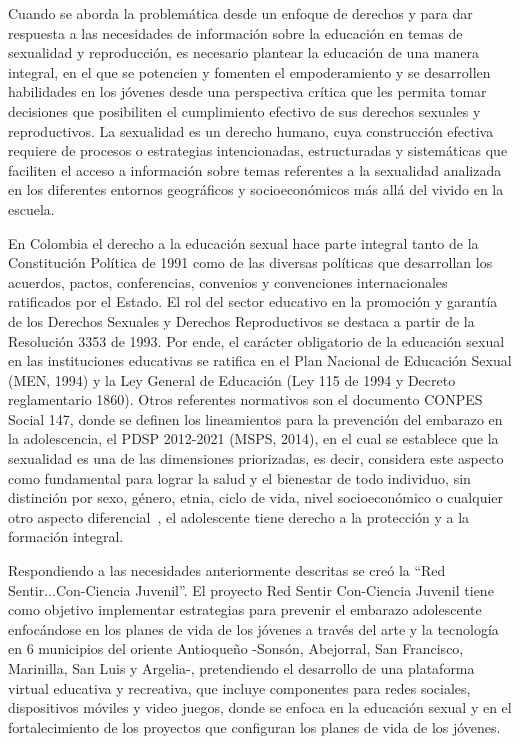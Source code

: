 \documentclass[journal,transmag]{IEEEtran}
\begin{document}
Cuando se aborda la problemática desde un enfoque de derechos y para dar respuesta a las necesidades de información sobre la educación en temas de sexualidad y reproducción, es necesario plantear la educación de una manera integral, en el que se potencien y fomenten el empoderamiento y se desarrollen habilidades en los jóvenes desde una perspectiva crítica que les permita tomar decisiones que posibiliten el cumplimiento efectivo de sus derechos sexuales y reproductivos. La sexualidad es un derecho humano, cuya construcción efectiva requiere de procesos o estrategias intencionadas, estructuradas y sistemáticas que faciliten el acceso a información sobre temas referentes a la sexualidad analizada en los diferentes entornos geográficos y socioeconómicos más allá del vivido en la escuela.

En Colombia el derecho a la educación sexual hace parte integral tanto de la Constitución Política de 1991 como de las diversas políticas que desarrollan los acuerdos, pactos, conferencias, convenios y convenciones internacionales ratificados por el Estado. El rol del sector educativo en la promoción y garantía de los Derechos Sexuales y Derechos Reproductivos se destaca a partir de la Resolución 3353 de 1993. Por ende, el carácter obligatorio de la educación sexual en las instituciones educativas se ratifica en el Plan Nacional de Educación Sexual (MEN, 1994) y la Ley General de Educación (Ley  115  de 1994 y Decreto reglamentario 1860). Otros referentes normativos son el documento CONPES Social 147, donde se definen los lineamientos para la prevención del embarazo en la adolescencia, el PDSP 2012-2021 (MSPS, 2014), en el cual  se  establece que la sexualidad es una de las dimensiones priorizadas, es decir, considera este aspecto como fundamental para lograr la salud y el bienestar de todo individuo, sin distinción por sexo, género, etnia, ciclo de vida, nivel socioeconómico o cualquier otro aspecto diferencial~\cite{Pro2015II}, el adolescente tiene derecho a la protección y a la formación integral.

Respondiendo a las necesidades anteriormente descritas se creó la ``Red Sentir...Con-Ciencia Juvenil''. El proyecto Red Sentir Con-Ciencia Juvenil tiene como objetivo implementar estrategias para prevenir el embarazo adolescente enfocándose en los planes de vida de los jóvenes a través del arte y la tecnología en 6 municipios del oriente Antioqueño -Sonsón, Abejorral, San Francisco, Marinilla, San Luis y Argelia-, pretendiendo el desarrollo de una plataforma virtual educativa y recreativa, que incluye componentes para redes sociales, dispositivos móviles y video juegos, donde se enfoca en la educación sexual y en el fortalecimiento de los proyectos que configuran los planes de vida de los jóvenes.
\end{document}
